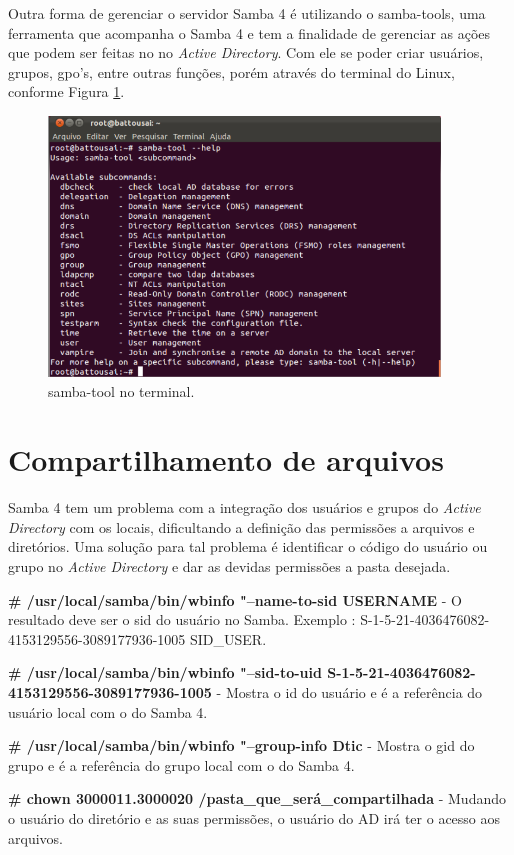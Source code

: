 Outra forma de gerenciar o servidor Samba 4 é utilizando o samba-tools, uma ferramenta que acompanha o Samba 4 e tem a finalidade de gerenciar as ações que podem ser feitas no no \textit{Active Directory}. Com ele se poder criar usuários, grupos, gpo's, entre outras funções, porém através do terminal do Linux, conforme Figura \ref{samba-tool}.

\pagebreak

\begin{figure}[ht]
   	\centering
    \includegraphics[width=0.7 \textwidth]{figuras/samba-tool}
   	\caption{samba-tool no terminal.}
    \label{samba-tool}
\end{figure}


\section{Compartilhamento de arquivos}

Samba 4 tem um problema com a integração dos usuários e grupos do \textit{Active Directory} com os locais, dificultando a definição das permissões a arquivos e diretórios. Uma solução para tal problema é identificar o código do usuário ou grupo no \textit{Active Directory} e dar as devidas permissões a pasta desejada.

\noindent \textbf{\# /usr/local/samba/bin/wbinfo "--name-to-sid USERNAME} - O resultado deve ser o sid do usuário no Samba. Exemplo : S-1-5-21-4036476082-4153129556-3089177936-1005 SID\_USER.

\noindent \textbf{\# /usr/local/samba/bin/wbinfo "--sid-to-uid S-1-5-21-4036476082-4153129556-3089177936-1005} - Mostra o id do usuário e é a referência do usuário local com o do Samba 4.

\noindent \textbf{\# /usr/local/samba/bin/wbinfo "--group-info Dtic} - Mostra o gid do grupo e é a referência do grupo local com o do Samba 4.

\noindent \textbf{\# chown 3000011.3000020 /pasta\_que\_será\_compartilhada} - Mudando o usuário do diretório e as suas permissões, o usuário do AD irá ter o acesso aos arquivos.